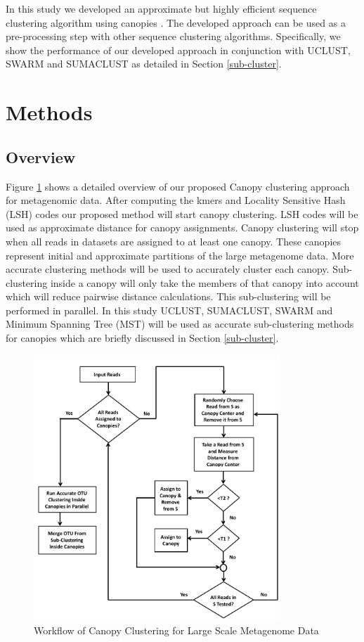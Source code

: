 \documentclass[10pt, conference, compsocconf]{IEEEtran}
\begin{document}
In 
this study we developed an approximate but highly efficient 
sequence clustering algorithm  using canopies \cite{MARCanopy}. 
%
The developed approach can be used as a pre-processing step with other 
sequence clustering algorithms. Specifically, we show the 
performance of our developed approach in conjunction with UCLUST, 
SWARM and SUMACLUST as detailed in Section \ref{sub-cluster}.

\section{Methods}
\label{featMethod}
\subsection{\textbf{Overview}}

Figure \ref{fig:flowchart} shows a detailed overview of our proposed Canopy clustering approach for metagenomic data. After computing the kmers and Locality Sensitive Hash (LSH) codes our proposed method will start canopy clustering. LSH codes will be used as approximate distance for canopy assignments. Canopy clustering will stop when all reads in datasets are assigned to at least one canopy. These canopies represent initial and approximate partitions of the large metagenome data. More accurate clustering methods will be used to accurately cluster each canopy. Sub-clustering inside a canopy will only take the members of that canopy into account which will reduce pairwise distance calculations. This sub-clustering will be performed in parallel. In this study UCLUST, SUMACLUST, SWARM and Minimum Spanning Tree (MST) will be used as accurate sub-clustering methods for canopies which are briefly discussed in Section \ref{sub-cluster}.

\begin{figure}
	\centering
	\includegraphics[width=\linewidth,height=10cm]{flowchart.pdf}	
	\caption{Workflow of Canopy Clustering for Large Scale Metagenome Data}
	\label{fig:flowchart}
\end{figure}
\end{document}
